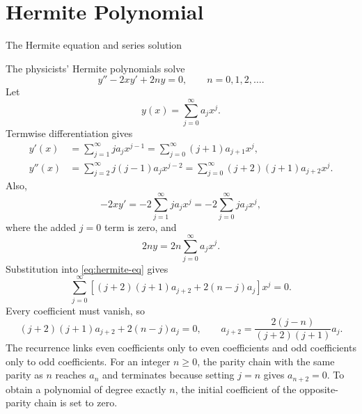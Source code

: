 \documentclass[11pt]{beamer}
\begin{document}
\section{Hermite Polynomial}

\begin{frame}[allowframebreaks]{The Hermite equation and series solution}
\footnotesize

The physicists' Hermite polynomials solve
\begin{equation}
  y''-2xy'+2ny=0,
  \qquad n=0,1,2,\ldots.
  \label{eq:hermite-eq}
\end{equation}
Let
\[
  y(x)=\sum_{j=0}^{\infty}a_jx^j.
\]
Termwise differentiation gives
\begin{align*}
  y'(x)
   &=\sum_{j=1}^{\infty}ja_jx^{j-1}
    =\sum_{j=0}^{\infty}(j+1)a_{j+1}x^j,\\
  y''(x)
   &=\sum_{j=2}^{\infty}j(j-1)a_jx^{j-2}
    =\sum_{j=0}^{\infty}(j+2)(j+1)a_{j+2}x^j.
\end{align*}
Also,
\[
  -2xy'=-2\sum_{j=1}^{\infty}ja_jx^j
         =-2\sum_{j=0}^{\infty}ja_jx^j,
\]
where the added $j=0$ term is zero, and
\[
  2ny=2n\sum_{j=0}^{\infty}a_jx^j.
\]
Substitution into \eqref{eq:hermite-eq} gives
\[
  \sum_{j=0}^{\infty}
  \left[(j+2)(j+1)a_{j+2}+2(n-j)a_j\right]x^j=0.
\]
Every coefficient must vanish, so
\begin{equation}
  (j+2)(j+1)a_{j+2}+2(n-j)a_j=0,
  \qquad
  a_{j+2}=\frac{2(j-n)}{(j+2)(j+1)}a_j.
  \label{eq:hermite-coefficient-recurrence}
\end{equation}
The recurrence links even coefficients only to even coefficients and odd coefficients only
to odd coefficients. For an integer $n\ge0$, the parity chain with the same parity as $n$
reaches $a_n$ and terminates because setting $j=n$ gives $a_{n+2}=0$. To obtain a
polynomial of degree exactly $n$, the initial coefficient of the opposite-parity chain is
set to zero.


\end{frame}
\end{document}
